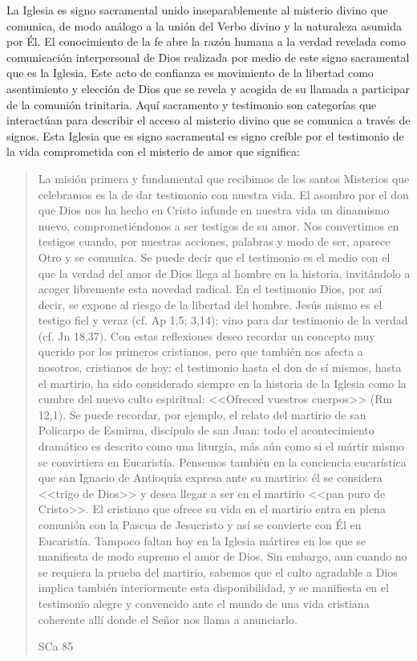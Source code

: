 La Iglesia es signo sacramental unido inseparablemente al misterio divino que
comunica, de modo análogo a la unión del Verbo divino y la naturaleza asumida
por Él. El conocimiento de la fe abre la razón humana a la verdad revelada como
comunicación interpersonal de Dios realizada por medio de este signo sacramental
que es la Iglesia. Este acto de confianza es movimiento de la libertad como
asentimiento y elección de Dios que se revela y acogida de su llamada a
participar de la comunión trinitaria. Aquí sacramento y testimonio son
categorías que interactúan para describir el acceso al misterio divino que se
comunica a través de signos. Esta Iglesia que es signo sacramental es signo
creíble por el testimonio de la vida comprometida con el misterio de amor que
significa:
\blockquote[SCa 85]{La misión primera y fundamental que recibimos de los santos
  Misterios que celebramos es la de dar testimonio con nuestra vida. El asombro
  por el don que Dios nos ha hecho en Cristo infunde en nuestra vida un
  dinamismo nuevo, comprometiéndonos a ser testigos de su amor. Nos convertimos
  en testigos cuando, por nuestras acciones, palabras y modo de ser, aparece
  Otro y se comunica. Se puede decir que el testimonio es el medio con el que la
  verdad del amor de Dios llega al hombre en la historia, invitándolo a acoger
  libremente esta novedad radical. En el testimonio Dios, por así decir, se
  expone al riesgo de la libertad del hombre. Jesús mismo es el testigo fiel y
  veraz (cf. Ap 1,5; 3,14); vino para dar testimonio de la verdad (cf. Jn
  18,37). Con estas reflexiones deseo recordar un concepto muy querido por los
  primeros cristianos, pero que también nos afecta a nosotros, cristianos de
  hoy: el testimonio hasta el don de sí mismos, hasta el martirio, ha sido
  considerado siempre en la historia de la Iglesia como la cumbre del nuevo
  culto espiritual: <<Ofreced vuestros cuerpos>> (Rm 12,1). Se puede recordar,
  por ejemplo, el relato del martirio de san Policarpo de Esmirna, discípulo de
  san Juan: todo el acontecimiento dramático es descrito como una liturgia, más
  aún como si el mártir mismo se convirtiera en Eucaristía. Pensemos también en
  la conciencia eucarística que san Ignacio de Antioquía expresa ante su
  martirio: él se considera <<trigo de Dios>> y desea llegar a ser en el
  martirio <<pan puro de Cristo>>. El cristiano que ofrece su vida en el
  martirio entra en plena comunión con la Pascua de Jesucristo y así se
  convierte con Él en Eucaristía. Tampoco faltan hoy en la Iglesia mártires en
  los que se manifiesta de modo supremo el amor de Dios. Sin embargo, aun cuando
  no se requiera la prueba del martirio, sabemos que el culto agradable a Dios
  implica también interiormente esta disponibilidad, y se manifiesta en el
  testimonio alegre y convencido ante el mundo de una vida cristiana coherente
  allí donde el Señor nos llama a anunciarlo.}
